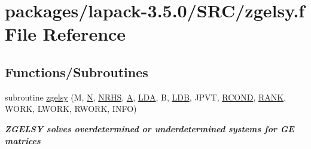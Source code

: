 \hypertarget{zgelsy_8f}{}\section{packages/lapack-\/3.5.0/\+S\+R\+C/zgelsy.f File Reference}
\label{zgelsy_8f}
\subsection*{Functions/\+Subroutines}
\begin{DoxyCompactItemize}
\item 
subroutine \hyperlink{group__complex16GEsolve_gab538c5c13af357a23b3b7433a3971354}{zgelsy} (M, \hyperlink{polmisc_8c_a0240ac851181b84ac374872dc5434ee4}{N}, \hyperlink{example__user_8c_aa0138da002ce2a90360df2f521eb3198}{N\+R\+H\+S}, \hyperlink{classA}{A}, \hyperlink{example__user_8c_ae946da542ce0db94dced19b2ecefd1aa}{L\+D\+A}, B, \hyperlink{example__user_8c_a50e90a7104df172b5a89a06c47fcca04}{L\+D\+B}, J\+P\+V\+T, \hyperlink{superlu__enum__consts_8h_af00a42ecad444bbda75cde1b64bd7e72a9b5c151728d8512307565994c89919d5}{R\+C\+O\+N\+D}, \hyperlink{splinemodule_8c_a3a88bcc63386de30443dacede2e01847}{R\+A\+N\+K}, W\+O\+R\+K, L\+W\+O\+R\+K, R\+W\+O\+R\+K, I\+N\+F\+O)
\begin{DoxyCompactList}\small\item\em {\bfseries  Z\+G\+E\+L\+S\+Y solves overdetermined or underdetermined systems for G\+E matrices} \end{DoxyCompactList}\end{DoxyCompactItemize}
